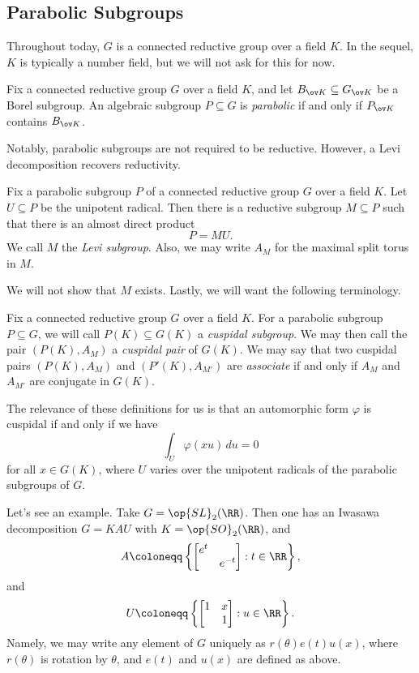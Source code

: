 \documentclass{article}
\begin{document}
\subsection{Parabolic Subgroups}
Throughout today, $G$ is a connected reductive group over a field $K$. In the sequel, $K$ is typically a number field, but we will not ask for this for now.
\begin{definition}[parabolic]
	Fix a connected reductive group $G$ over a field $K$, and let $B_{\ov K}\subseteq G_{\ov K}$ be a Borel subgroup. An algebraic subgroup $P\subseteq G$ is \textit{parabolic} if and only if $P_{\ov K}$ contains $B_{\ov K}$.
\end{definition}
Notably, parabolic subgroups are not required to be reductive. However, a Levi decomposition recovers reductivity.
\begin{definition}
	Fix a parabolic subgroup $P$ of a connected reductive group $G$ over a field $K$. Let $U\subseteq P$ be the unipotent radical. Then there is a reductive subgroup $M\subseteq P$ such that there is an almost direct product
	\[P=MU.\]
	We call $M$ the \textit{Levi subgroup}. Also, we may write $A_M$ for the maximal split torus in $M$.
\end{definition}
We will not show that $M$ exists. Lastly, we will want the following terminology.
\begin{definition}[cuspidal]
	Fix a connected reductive group $G$ over a field $K$. For a parabolic subgroup $P\subseteq G$, we will call $P(K)\subseteq G(K)$ a \textit{cuspidal subgroup}. We may then call the pair $(P(K),A_M)$ a \textit{cuspidal pair} of $G(K)$. We may say that two cuspidal pairs $(P(K),A_M)$ and $(P'(K),A_{M'})$ are \textit{associate} if and only if $A_M$ and $A_{M'}$ are conjugate in $G(K)$.
\end{definition}
\begin{remark}
	The relevance of these definitions for us is that an automorphic form $\varphi$ is cuspidal if and only if we have
	\[\int_U\varphi(xu)\,du=0\]
	for all $x\in G(K)$, where $U$ varies over the unipotent radicals of the parabolic subgroups of $G$.
\end{remark}
Let's see an example. Take $G=\op{SL}_2(\RR)$. Then one has an Iwasawa decomposition $G=KAU$ with $K=\op{SO}_2(\RR)$, and
\[A\coloneqq\left\{\begin{bmatrix}
	e^t \\ & e^{-t}
\end{bmatrix}:t\in\RR\right\},\]
and
\[U\coloneqq\left\{\begin{bmatrix}
	1 & x \\ & 1
\end{bmatrix}:u\in\RR\right\}.\]
Namely, we may write any element of $G$ uniquely as $r(\theta)e(t)u(x)$, where $r(\theta)$ is rotation by $\theta$, and $e(t)$ and $u(x)$ are defined as above.
\end{document}

